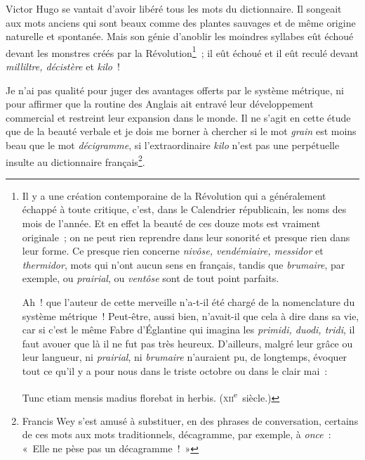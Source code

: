 \documentclass[french,twoside]{book} %
\newcommand\chaptercont{} %
\begin{document}
\chaptercont
\noindent Victor Hugo se vantait d’avoir libéré tous les mots du dictionnaire. Il songeait aux mots anciens qui sont beaux comme des plantes sauvages et de même origine naturelle et spontanée. Mais son génie d’anoblir les moindres syllabes eût échoué devant les monstres créés par la Révolution\footnote{ \noindent Il y a une création contemporaine de la Révolution qui a généralement échappé à toute critique, c’est, dans le Calendrier républicain, les noms des mois de l’année. Et en effet la beauté de ces douze mots est vraiment originale ; on ne peut rien reprendre dans leur sonorité et presque rien dans leur forme. Ce presque rien concerne {\itshape nivôse, vendémiaire, messidor} et {\itshape thermidor}, mots qui n’ont aucun sens en français, tandis que {\itshape brumaire}, par exemple, ou {\itshape prairial}, ou {\itshape ventôse} sont de tout point parfaits.\par
 Ah ! que l’auteur de cette merveille n’a-t-il été chargé de la nomenclature du système métrique ! Peut-être, aussi bien, n’avait-il que cela à dire dans sa vie, car si c’est le même Fabre d’Églantine qui imagina les {\itshape primidi, duodi, tridi}, il faut avouer que là il ne fut pas très heureux. D’ailleurs, malgré leur grâce ou leur langueur, ni {\itshape prairial}, ni {\itshape brumaire} n’auraient pu, de longtemps, évoquer tout ce qu’il y a pour nous dans le triste octobre ou dans le clair mai :\par
 Tunc etiam mensis madius florebat in herbis. (\textsc{xii}\textsuperscript{e} siècle.)
} ; il eût échoué et il eût reculé devant {\itshape milliltre, décistère} et {\itshape kilo} !\par
Je n’ai pas qualité pour juger des avantages offerts par le système métrique, ni pour affirmer que la routine des Anglais ait entravé leur développement commercial et restreint leur expansion dans le monde. Il ne s’agit en cette étude que de la beauté verbale et je dois me borner à chercher si le mot {\itshape grain} est moins beau que le mot {\itshape décigramme}, si l’extraordinaire {\itshape kilo} n’est pas une perpétuelle insulte au dictionnaire français\footnote{Francis Wey s’est amusé à substituer, en des phrases de conversation, certains de ces mots aux mots traditionnels, décagramme, par exemple, à {\itshape once} : « Elle ne pèse pas un décagramme ! »}.\par
\end{document}
